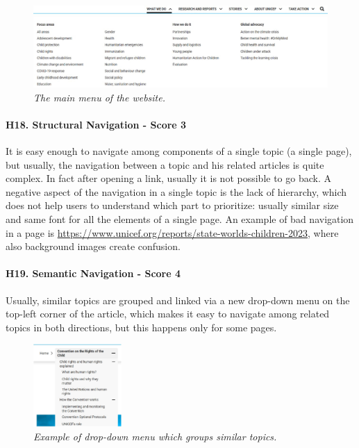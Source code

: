 \begin{figure}[!h]
	\begin{center}
		\includegraphics[width=\textwidth]{FinalScores20.jpg}
		\captionsetup{font=small}
		\caption{\textit{The main menu of the website.}}
	\end{center}
\end{figure}
\newline
\newline \paragraph{H18. Structural Navigation - Score 3}  \label{subsec:H18}	It is easy enough to navigate among components of a single topic (a single page), but usually, the navigation between a topic and his related articles is quite complex. In fact after opening a link, usually it is not possible to go back.
\newline A negative aspect of the navigation in a single topic is the lack of hierarchy, which does not help users to understand which part to prioritize: usually similar size and same font for all the elements of a single page.
\newline An example of bad navigation in a page is \href{https://www.unicef.org/reports/state-worlds-children-2023}{https://www.unicef.org/reports/state-worlds-children-2023}, where also background images create confusion.
\newline
\newline \paragraph{H19. Semantic Navigation - Score 4}  \label{subsec:H19}	Usually, similar topics are grouped and linked via a new drop-down menu on the top-left corner of the article, which makes it easy to navigate among related topics in both directions, but this happens only for some pages.
\begin{figure}[!h]
	\begin{center}
		\includegraphics[width=0.3\textwidth]{FinalScores21.jpg}
		\captionsetup{font=small}
		\caption{\textit{Example of drop-down menu which groups similar topics.}}
	\end{center}
\end{figure}
